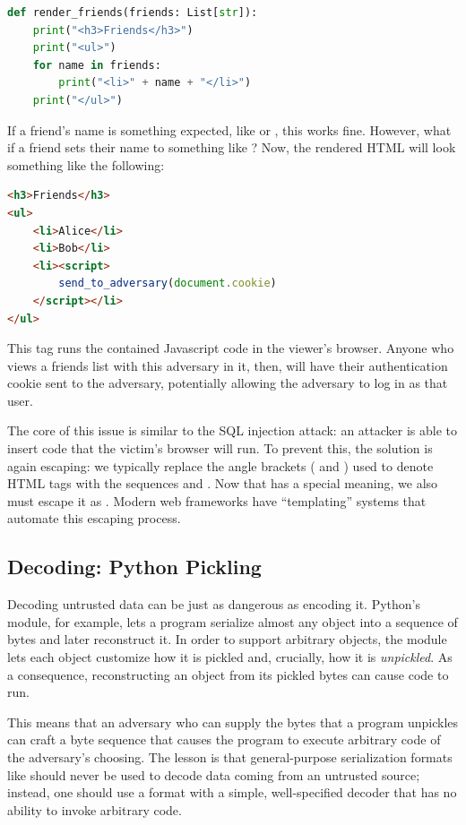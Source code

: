 \begin{lstlisting}[language=python]
def render_friends(friends: List[str]):
	print("<h3>Friends</h3>")
	print("<ul>")
	for name in friends:
		print("<li>" + name + "</li>")
	print("</ul>")
\end{lstlisting}

If a friend's name is something expected, like  or , this works fine. However, what if a friend sets their name to something like ? Now, the rendered HTML will look something like the following:

\begin{lstlisting}[language=html]
<h3>Friends</h3>	
<ul>
	<li>Alice</li>
	<li>Bob</li>
	<li><script>
		send_to_adversary(document.cookie)
	</script></li>
</ul>
\end{lstlisting}

This  tag runs the contained Javascript code in the viewer's browser. Anyone who views a friends list with this adversary in it, then, will have their authentication cookie sent to the adversary, potentially allowing the adversary to log in as that user.

The core of this issue is similar to the SQL injection attack: an attacker is
able to insert code that the victim's browser will run. To prevent this, the solution is again
escaping: we typically replace the angle brackets (\ttt{<} and \ttt{>}) used to denote HTML tags 
with the sequences  and . Now
that \ttt{&} has a special meaning, we also must escape it as .
Modern web frameworks have ``templating'' systems that automate this escaping process.

\subsection{Decoding: Python Pickling}
Decoding untrusted data can be just as dangerous as encoding it. Python's
 module, for example, lets a program serialize almost any
object into a sequence of bytes and later reconstruct it. In order to
support arbitrary objects, the module lets each object customize how it
is pickled and, crucially, how it is \emph{unpickled}. As a consequence,
reconstructing an object from its pickled bytes can cause code to run.

This means that an adversary who can supply the bytes that a program
unpickles can craft a byte sequence that causes the program to execute
arbitrary code of the adversary's choosing. The lesson is that
general-purpose serialization formats like  should never be
used to decode data coming from an untrusted source; instead, one should
use a format with a simple, well-specified decoder that has no ability to
invoke arbitrary code.

